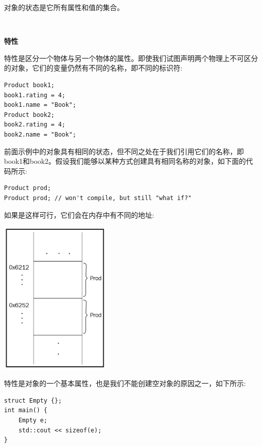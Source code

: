 对象的状态是它所有属性和值的集合。 \par

\noindent\textbf{}\ \par
\textbf{特性} \ \par
特性是区分一个物体与另一个物体的属性。即使我们试图声明两个物理上不可区分的对象，它们的变量仍然有不同的名称，即不同的标识符: \par

\begin{lstlisting}[caption={}]
Product book1;
book1.rating = 4;
book1.name = "Book";
Product book2;
book2.rating = 4;
book2.name = "Book";
\end{lstlisting}

前面示例中的对象具有相同的状态，但不同之处在于我们引用它们的名称，即book1和book2。假设我们能够以某种方式创建具有相同名称的对象，如下面的代码所示: \par

\begin{lstlisting}[caption={}]
Product prod;
Product prod; // won't compile, but still "what if?"
\end{lstlisting}

如果是这样可行，它们会在内存中有不同的地址: \par

\begin{center}
	\includegraphics[width=0.4\textwidth]{content/Section-1/Chapter-3/4}
\end{center}

特性是对象的一个基本属性，也是我们不能创建空对象的原因之一，如下所示:\par

\begin{lstlisting}[caption={}]
struct Empty {};
int main() {
	Empty e;
	std::cout << sizeof(e);
}
\end{lstlisting}

